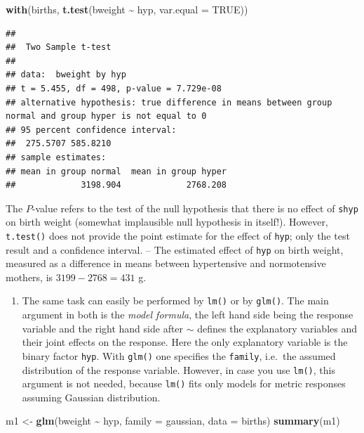 \documentclass[
]{book}
\newenvironment{Shaded}{\begin{snugshade}}{\end{snugshade}}
\newcommand{\AttributeTok}[1]{\textcolor[rgb]{0.13,0.29,0.53}{#1}}
\newcommand{\ConstantTok}[1]{\textcolor[rgb]{0.56,0.35,0.01}{#1}}
\newcommand{\FunctionTok}[1]{\textcolor[rgb]{0.13,0.29,0.53}{\textbf{#1}}}
\newcommand{\NormalTok}[1]{#1}
\newcommand{\OtherTok}[1]{\textcolor[rgb]{0.56,0.35,0.01}{#1}}
\newcommand{\SpecialCharTok}[1]{\textcolor[rgb]{0.81,0.36,0.00}{\textbf{#1}}}
\providecommand{\tightlist}{%
  \setlength{\itemsep}{0pt}\setlength{\parskip}{0pt}}
\begin{document}
\begin{Shaded}
\begin{Highlighting}[]
\FunctionTok{with}\NormalTok{(births, }\FunctionTok{t.test}\NormalTok{(bweight }\SpecialCharTok{\textasciitilde{}}\NormalTok{ hyp, }\AttributeTok{var.equal =} \ConstantTok{TRUE}\NormalTok{))}
\end{Highlighting}
\end{Shaded}

\begin{verbatim}
## 
##  Two Sample t-test
## 
## data:  bweight by hyp
## t = 5.455, df = 498, p-value = 7.729e-08
## alternative hypothesis: true difference in means between group normal and group hyper is not equal to 0
## 95 percent confidence interval:
##  275.5707 585.8210
## sample estimates:
## mean in group normal  mean in group hyper 
##             3198.904             2768.208
\end{verbatim}

The \(P\)-value refers to the test
of the null hypothesis that there is no effect of \texttt{shyp} on birth weight
(somewhat implausible null hypothesis in itself!).
However, \texttt{t.test()} does not provide
the point estimate for the effect of \texttt{hyp}; only the test result and a confidence interval. -- The estimated effect of \texttt{hyp} on birth weight,
measured as a difference in means between hypertensive and normotensive
mothers,
is \(3199-2768 = 431\) g.

\begin{enumerate}
\def\labelenumi{\arabic{enumi}.}
\setcounter{enumi}{1}
\tightlist
\item
  The same task can easily be performed by \texttt{lm()} or by \texttt{glm()}.
  The main argument in both
  is the \emph{model formula}, the left hand side being the response variable
  and the right hand side
  after \(\sim\) defines the explanatory variables and their
  joint effects on the response. Here the only
  explanatory variable is the binary factor \texttt{hyp}. With \texttt{glm()} one specifies the
  \texttt{family}, i.e.~the assumed distribution of the response variable. However,
  in case you use
  \texttt{lm()}, this argument is not needed, because \texttt{lm()} fits only
  models for metric responses assuming Gaussian distribution.
\end{enumerate}

\begin{Shaded}
\begin{Highlighting}[]
\NormalTok{m1 }\OtherTok{\textless{}{-}} \FunctionTok{glm}\NormalTok{(bweight }\SpecialCharTok{\textasciitilde{}}\NormalTok{ hyp, }\AttributeTok{family =}\NormalTok{ gaussian, }\AttributeTok{data =}\NormalTok{ births)}
\FunctionTok{summary}\NormalTok{(m1)}
\end{Highlighting}
\end{Shaded}
\end{document}
